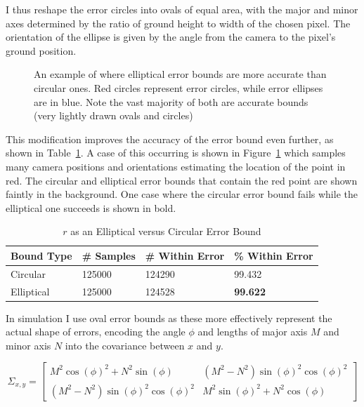 \documentclass[a4paper,12pt,twoside,openright]{report}
\begin{document}
I thus reshape the error circles into ovals of equal area, with the major
and minor axes determined by the ratio of ground height to width of the chosen pixel.
The orientation of the ellipse is given by the angle from the camera to the pixel's
ground position.


\begin{figure}[htb]
    \begin{center}
        
    \end{center}
    \caption[elliptical versus circular error]{An example of where elliptical error bounds are more accurate than circular ones. Red circles represent error circles, while error ellipses are in blue. Note the vast majority of both are accurate bounds (very lightly drawn ovals and circles)}
    \label{fig:camera:oval better}
\end{figure}

This modification improves the accuracy of the error bound even further, as shown
in Table~\ref{tab:camera:ellipse vs circle}. A case of this occurring is shown
in Figure~\ref{fig:camera:oval better} which samples many camera positions and orientations
estimating the location of the point in red. The circular and elliptical 
error bounds that contain the red point are shown faintly in the background. One
case where the circular error bound fails while the elliptical one succeeds
is shown in bold.

\begin{table}[htb]
    \centering
    \caption[Elliptical versus Circular Error Bound]{$r$ as an Elliptical versus Circular Error Bound}
    \label{tab:camera:ellipse vs circle}
    \begin{tabular}{@{}llll@{}}
        \toprule
        Bound Type    & \# Samples  & \# Within Error& \% Within Error \\ \midrule
        Circular      &   125000              & 124290                  & 99.432  \\
        Elliptical    &   125000              & 124528                  & \textbf{99.622}
    \end{tabular}
\end{table}


In simulation I use oval error bounds as these more effectively represent the 
actual shape of errors, encoding the angle $\phi$ and lengths of major axis $M$
and minor axis $N$ into the covariance between $x$ and $y$.

\[
\Sigma_{x,y} =
  \begin{bmatrix}
    M^2 \cos(\phi)^2 + N^2 \sin(\phi) &  (M^2 - N^2) \sin(\phi)^2 \cos(\phi)^2 \\
    (M^2 - N^2) \sin(\phi)^2 \cos(\phi)^2  &  M^2 \sin(\phi)^2 + N^2\cos(\phi) 
  \end{bmatrix}
\]
\end{document}
